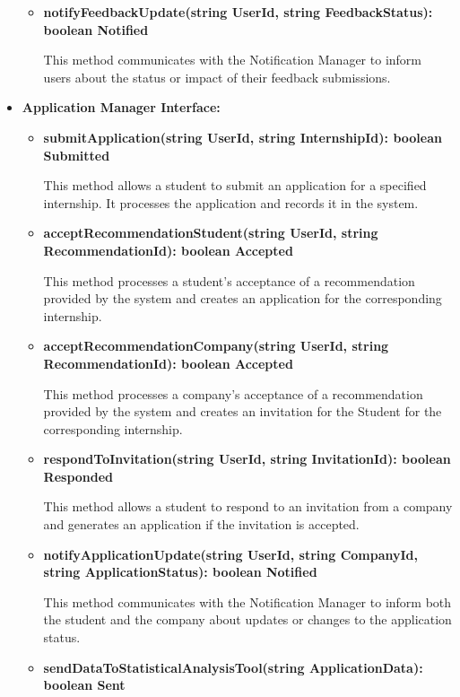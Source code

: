 \begin{itemize}
\begin{itemize}
    \item \textbf{notifyFeedbackUpdate(string UserId, string FeedbackStatus): boolean Notified}

    This method communicates with the Notification Manager to inform users about the status or impact of their feedback submissions.
    \end{itemize}
    
\item \textbf{Application Manager Interface:}
\begin{itemize}
    \item \textbf{submitApplication(string UserId, string InternshipId): boolean Submitted}

    This method allows a student to submit an application for a specified internship. It processes the application and records it in the system.

    \item \textbf{acceptRecommendationStudent(string UserId, string RecommendationId): boolean Accepted}

    This method processes a student's acceptance of a recommendation provided by the system and creates an application for the corresponding internship.

     \item \textbf{acceptRecommendationCompany(string UserId, string RecommendationId): boolean Accepted}

    This method processes a company's acceptance of a recommendation provided by the system and creates an invitation for the Student for the corresponding internship.

    \item \textbf{respondToInvitation(string UserId, string InvitationId): boolean Responded}

    This method allows a student to respond to an invitation from a company and generates an application if the invitation is accepted.

    \item \textbf{notifyApplicationUpdate(string UserId, string CompanyId, string ApplicationStatus): boolean Notified}

    This method communicates with the Notification Manager to inform both the student and the company about updates or changes to the application status.

    \item \textbf{sendDataToStatisticalAnalysisTool(string ApplicationData): boolean Sent}


\end{itemize}
\end{itemize}
